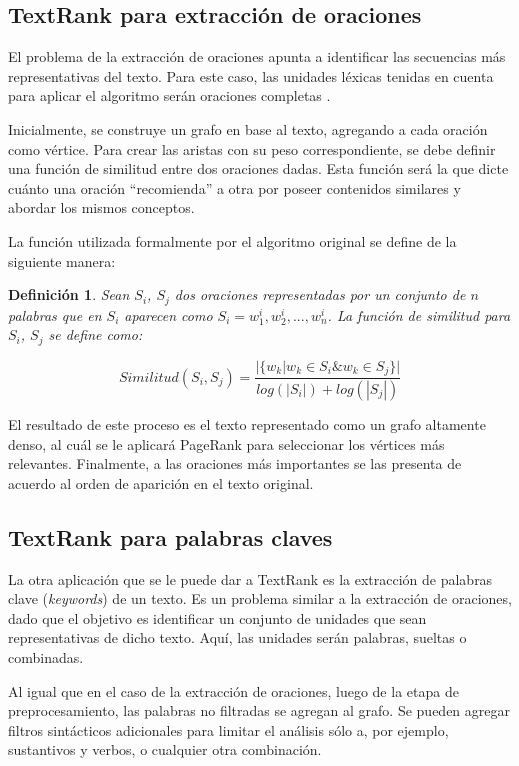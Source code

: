 \documentclass[a4paper]{article}
\newtheorem{definicion}{Definición}
\begin{document}
\subsection{TextRank para extracción de oraciones}
El problema de la extracción de oraciones apunta a identificar las secuencias más representativas del texto. Para este caso, las unidades léxicas tenidas en cuenta para aplicar el algoritmo serán oraciones completas \cite{introductionir}.

Inicialmente, se construye un grafo en base al texto, agregando a cada oración como vértice. Para crear las aristas con su peso correspondiente, se debe definir una función de similitud entre dos oraciones dadas. Esta función será la que dicte cuánto una oración “recomienda” a otra por poseer contenidos similares y abordar los mismos conceptos.
    
La función utilizada formalmente por el algoritmo original se define de la siguiente manera:

\begin{definicion}
Sean $S_i$, $S_j$ dos oraciones representadas por un conjunto de $n$ palabras que en 
$S_i$ aparecen como $S_i = w_{1}^{i}, w_{2}^{i},..., w_{n}^{i}$. La función de similitud para $S_i$, $S_j$ se define como:

\begin{equation}
Similitud(S_{i},S_{j}) = \frac{ | \{   w_{k} | w_{k} \in S_{i} \& w_{k} \in S_{j}   \}  | }    
                              {  log(|S_{i}|) + log(|S_{j}|)  }
\end{equation}
\end{definicion}
    
El resultado de este proceso es el texto representado como un grafo altamente denso, al cuál se le aplicará PageRank para seleccionar los vértices más relevantes.
Finalmente, a las oraciones más importantes se las presenta de acuerdo al orden de aparición en el texto original.


\subsection{TextRank para palabras claves}
La otra aplicación que se le puede dar a TextRank es la extracción de palabras clave (\textit{keywords}) de un texto. Es un problema similar a la extracción de oraciones, dado que el objetivo es identificar un conjunto de unidades que sean representativas de dicho texto. Aquí, las unidades serán palabras, sueltas o combinadas.

Al igual que en el caso de la extracción de oraciones, luego de la etapa de preprocesamiento, las palabras no filtradas se agregan al grafo. Se pueden agregar filtros sintácticos adicionales para limitar el análisis sólo a, por ejemplo, sustantivos y verbos, o cualquier otra combinación. 
\end{document}
